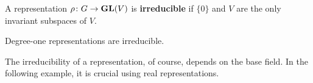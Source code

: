 
\begin{definition}
    A representation $\rho\colon G\to\mathbf{GL}(V)$ is \textbf{irreducible} if
    $\{0\}$ and $V$ are the only invariant subspaces of $V$.
\end{definition}

Degree-one representations are irreducible. 

The irreducibility 
of a representation, of course, depends on the base field. 
In the following example, it is crucial using real representations.

